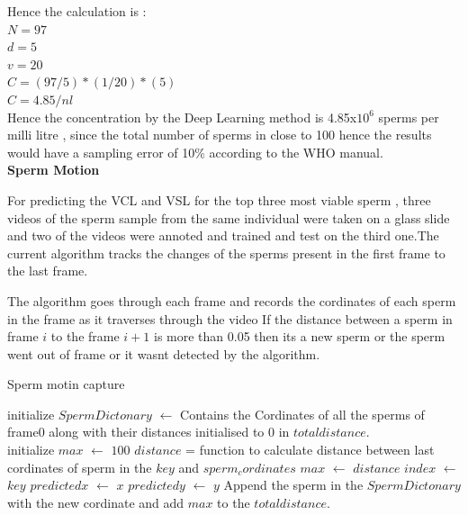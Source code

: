 \documentclass{article}
\begin{document}
Hence the calculation is : \\

$N = 97$ \\
$d = 5$ \\
$v = 20$ \\

$C = (97/5)*(1/20)*(5) $ \\
$C = 4.85/nl$ \\
Hence the concentration by the Deep Learning method is 4.85x$10^6$ sperms per milli litre , since the total number of sperms in close to 100 hence the results would have a 
sampling error of 10\% according to the WHO manual.
\\

\textbf{Sperm Motion} 

For predicting the VCL and VSL for the top three most viable sperm , three videos of the sperm sample from the same individual were taken on a 
glass slide and two of the videos were annoted and trained and test on the third one.The current algorithm tracks the changes of the sperms present in the first frame to the last frame.


The algorithm goes through each frame and records the cordinates of each sperm in the frame as it traverses through the video 
If the distance between a sperm in frame $i$ to the frame $i+1$ is more than 0.05 then its a new sperm or the sperm went out of frame or it wasnt detected by the algorithm.
\begin{algorithm}[H]
  \caption{Sperm motin capture}\label{your_label}
  \begin{algorithmic}
    \STATE  initialize $SpermDictonary$ $\gets$  Contains the Cordinates of all the sperms of frame0 along with 
    their distances initialised to 0 in $total distance$.\\
          \STATE initialize $max$  $\gets$ $100$
            \STATE $distance$ = function to calculate distance between last cordinates of sperm in the $key$ and $sperm_cordinates$ 
              \STATE $max$ $\gets$ $distance$
              \STATE $index$ $\gets$ $key$
              \STATE $predictedx$  $\gets$ $x$
              \STATE $predictedy$  $\gets$ $y$
            \ENDIF
          \ENDFOR
          \STATE  Append the sperm in the  $SpermDictonary$ with the new cordinate and add $max$ to the $total distance$. 
          \ENDIF
          \ENDFOR
        \ENDFOR
  \end{algorithmic}
\end{algorithm}
\end{document}
